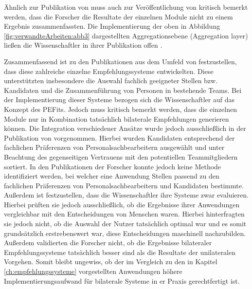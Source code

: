 Ähnlich zur Publikation von \textcite[S. 3ff.]{malinowski:2006} muss auch zur Veröffentlichung von \textcite[S. 5ff.]{keim:2007} kritisch bemerkt werden, dass die Forscher die Resultate der einzelnen Module nicht zu einem Ergebnis zusammenfassten. Die Implementierung der oben in Abbildung \ref{fig:verwandteArbeiten:abb3} dargestellten Aggregationsebene (Aggregation layer) ließen die Wissenschaftler in ihrer Publikation offen \cite[S. 8]{keim:2007}.

Zusammenfassend ist zu den Publikationen aus dem Umfeld von \textcite[S. 4]{malinowski:2006} festzustellen, dass diese zahlreiche einzelne Empfehlungssysteme entwickelten. Diese unterstützten insbesondere die Auswahl fachlich geeigneter Stellen bzw. Kandidaten und die Zusammenführung von Personen in bestehende Teams. Bei der Implementierung dieser Systeme bezogen sich die Wissenschaftler auf das Konzept des \acp{PEFit}. Jedoch muss kritisch bemerkt werden, dass die einzelnen Module nur in Kombination tatsächlich bilaterale Empfehlungen generieren können. Die Integration verschiedener Ansätze wurde jedoch ausschließlich in der Publikation von \textcite[S. 4ff.]{malinowski:2005} vorgenommen. Hierbei wurden Kandidaten entsprechend der fachlichen Präferenzen von Personalsachbearbeitern ausgewählt und unter Beachtung des gegenseitigen Vertrauens mit den potentiellen Teammitgliedern sortiert. In den Publikationen der Forscher konnte jedoch keine Methode identifiziert werden, bei welcher eine Anwendung Stellen passend zu den fachlichen Präferenzen von Personalsachbearbeitern und Kandidaten bestimmte. Außerdem ist festzustellen, dass die Wissenschaftler ihre Systeme zwar evaluieren. Hierbei prüften sie jedoch ausschließlich, ob die Ergebnisse ihrer Anwendungen vergleichbar mit den Entscheidungen von Menschen waren. Hierbei hinterfragten sie jedoch nicht, ob die Auswahl der Nutzer tatsächlich optimal war und es somit grundsätzlich erstrebenswert war, diese Entscheidungen maschinell nachzubilden. Außerdem validierten die Forscher nicht, ob die Ergebnisse bilateraler Empfehlungssysteme tatsächlich besser sind als die Resultate der unilateralen Vorgehen. Somit bleibt ungewiss, ob der im Vergleich zu den in Kapitel \ref{ch:empfehlungssysteme} vorgestellten Anwendungen höhere Implementierungsaufwand für bilaterale Systeme in er Praxis gerechtfertigt ist.

